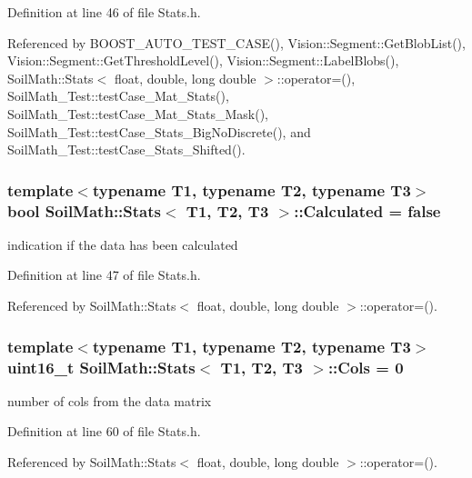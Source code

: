 Definition at line 46 of file Stats.\+h.



Referenced by B\+O\+O\+S\+T\+\_\+\+A\+U\+T\+O\+\_\+\+T\+E\+S\+T\+\_\+\+C\+A\+S\+E(), Vision\+::\+Segment\+::\+Get\+Blob\+List(), Vision\+::\+Segment\+::\+Get\+Threshold\+Level(), Vision\+::\+Segment\+::\+Label\+Blobs(), Soil\+Math\+::\+Stats$<$ float, double, long double $>$\+::operator=(), Soil\+Math\+\_\+\+Test\+::test\+Case\+\_\+\+Mat\+\_\+\+Stats(), Soil\+Math\+\_\+\+Test\+::test\+Case\+\_\+\+Mat\+\_\+\+Stats\+\_\+\+Mask(), Soil\+Math\+\_\+\+Test\+::test\+Case\+\_\+\+Stats\+\_\+\+Big\+No\+Discrete(), and Soil\+Math\+\_\+\+Test\+::test\+Case\+\_\+\+Stats\+\_\+\+Shifted().

\hypertarget{class_soil_math_1_1_stats_a3d3cd491b829b2e30f6752fee38fe261}{}
\subsubsection[{Calculated}]{\setlength{\rightskip}{0pt plus 5cm}template$<$typename T1, typename T2, typename T3$>$ bool {\bf Soil\+Math\+::\+Stats}$<$ T1, T2, T3 $>$\+::Calculated = false}\label{class_soil_math_1_1_stats_a3d3cd491b829b2e30f6752fee38fe261}
indication if the data has been calculated 

Definition at line 47 of file Stats.\+h.



Referenced by Soil\+Math\+::\+Stats$<$ float, double, long double $>$\+::operator=().

\hypertarget{class_soil_math_1_1_stats_a971f1ec23c32137805c4577f05454d83}{}
\subsubsection[{Cols}]{\setlength{\rightskip}{0pt plus 5cm}template$<$typename T1, typename T2, typename T3$>$ uint16\+\_\+t {\bf Soil\+Math\+::\+Stats}$<$ T1, T2, T3 $>$\+::Cols = 0}\label{class_soil_math_1_1_stats_a971f1ec23c32137805c4577f05454d83}
number of cols from the data matrix 

Definition at line 60 of file Stats.\+h.



Referenced by Soil\+Math\+::\+Stats$<$ float, double, long double $>$\+::operator=().

